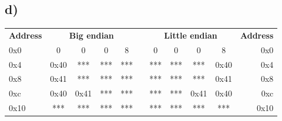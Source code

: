 \documentclass[a4paper,11pt]{report}
\begin{document}
\subsection*{d)}

\begin{table}[h]
\centering
\begin{tabular}{lcccclccccr}
\textbf{Address}          & \multicolumn{4}{c}{\textbf{Big endian}}                                                                     &                       & \multicolumn{4}{c}{\textbf{Little endian}}                                                                  & \multicolumn{1}{l}{\textbf{Address}} \\ \cline{2-5} \cline{7-10}
\multicolumn{1}{l|}{0x0}  & \multicolumn{1}{c|}{0}    & \multicolumn{1}{c|}{0}    & \multicolumn{1}{c|}{0}   & \multicolumn{1}{c|}{8}   & \multicolumn{1}{l|}{} & \multicolumn{1}{c|}{0}   & \multicolumn{1}{c|}{0}   & \multicolumn{1}{c|}{0}    & \multicolumn{1}{c|}{8}    & 0x0                                  \\ \cline{2-5} \cline{7-10}
\multicolumn{1}{l|}{0x4}  & \multicolumn{1}{c|}{0x40} & \multicolumn{1}{c|}{***}  & \multicolumn{1}{c|}{***} & \multicolumn{1}{c|}{***} & \multicolumn{1}{l|}{} & \multicolumn{1}{c|}{***} & \multicolumn{1}{c|}{***} & \multicolumn{1}{c|}{***}  & \multicolumn{1}{c|}{0x40} & 0x4                                  \\ \cline{2-5} \cline{7-10}
\multicolumn{1}{l|}{0x8}  & \multicolumn{1}{c|}{0x41} & \multicolumn{1}{c|}{***}  & \multicolumn{1}{c|}{***} & \multicolumn{1}{c|}{***} & \multicolumn{1}{l|}{} & \multicolumn{1}{c|}{***} & \multicolumn{1}{c|}{***} & \multicolumn{1}{c|}{***}  & \multicolumn{1}{c|}{0x41} & 0x8                                  \\ \cline{2-5} \cline{7-10}
\multicolumn{1}{l|}{0xc}  & \multicolumn{1}{c|}{0x40} & \multicolumn{1}{c|}{0x41} & \multicolumn{1}{c|}{***} & \multicolumn{1}{c|}{***} & \multicolumn{1}{l|}{} & \multicolumn{1}{c|}{***} & \multicolumn{1}{c|}{***} & \multicolumn{1}{c|}{0x41} & \multicolumn{1}{c|}{0x40} & 0xc                                  \\ \cline{2-5} \cline{7-10}
\multicolumn{1}{l|}{0x10} & \multicolumn{1}{c|}{***}  & \multicolumn{1}{c|}{***}  & \multicolumn{1}{c|}{***} & \multicolumn{1}{c|}{***} & \multicolumn{1}{l|}{} & \multicolumn{1}{c|}{***} & \multicolumn{1}{c|}{***} & \multicolumn{1}{c|}{***}  & \multicolumn{1}{c|}{***}  & 0x10                                 \\ \cline{2-5} \cline{7-10}
\end{tabular}
\end{table}
\end{document}
